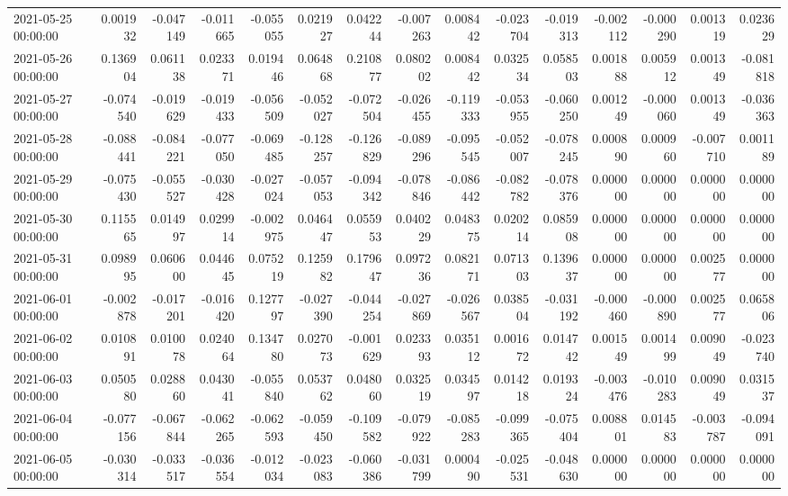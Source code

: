\begin{tabular}{lrrrrrrrrrrrrrr}
2021-05-25 00:00:00 & 0.001932 & -0.047149 & -0.011665 & -0.055055 & 0.021927 & 0.042244 & -0.007263 & 0.008442 & -0.023704 & -0.019313 & -0.002112 & -0.000290 & 0.001319 & 0.023629 \\
2021-05-26 00:00:00 & 0.136904 & 0.061138 & 0.023371 & 0.019446 & 0.064868 & 0.210877 & 0.080202 & 0.008442 & 0.032534 & 0.058503 & 0.001888 & 0.005912 & 0.001349 & -0.081818 \\
2021-05-27 00:00:00 & -0.074540 & -0.019629 & -0.019433 & -0.056509 & -0.052027 & -0.072504 & -0.026455 & -0.119333 & -0.053955 & -0.060250 & 0.001249 & -0.000060 & 0.001349 & -0.036363 \\
2021-05-28 00:00:00 & -0.088441 & -0.084221 & -0.077050 & -0.069485 & -0.128257 & -0.126829 & -0.089296 & -0.095545 & -0.052007 & -0.078245 & 0.000890 & 0.000960 & -0.007710 & 0.001189 \\
2021-05-29 00:00:00 & -0.075430 & -0.055527 & -0.030428 & -0.027024 & -0.057053 & -0.094342 & -0.078846 & -0.086442 & -0.082782 & -0.078376 & 0.000000 & 0.000000 & 0.000000 & 0.000000 \\
2021-05-30 00:00:00 & 0.115565 & 0.014997 & 0.029914 & -0.002975 & 0.046447 & 0.055953 & 0.040229 & 0.048375 & 0.020214 & 0.085908 & 0.000000 & 0.000000 & 0.000000 & 0.000000 \\
2021-05-31 00:00:00 & 0.098995 & 0.060600 & 0.044645 & 0.075219 & 0.125982 & 0.179647 & 0.097236 & 0.082171 & 0.071303 & 0.139637 & 0.000000 & 0.000000 & 0.002577 & 0.000000 \\
2021-06-01 00:00:00 & -0.002878 & -0.017201 & -0.016420 & 0.127797 & -0.027390 & -0.044254 & -0.027869 & -0.026567 & 0.038504 & -0.031192 & -0.000460 & -0.000890 & 0.002577 & 0.065806 \\
2021-06-02 00:00:00 & 0.010891 & 0.010078 & 0.024064 & 0.134780 & 0.027073 & -0.001629 & 0.023393 & 0.035112 & 0.001672 & 0.014742 & 0.001549 & 0.001499 & 0.009049 & -0.023740 \\
2021-06-03 00:00:00 & 0.050580 & 0.028860 & 0.043041 & -0.055840 & 0.053762 & 0.048060 & 0.032519 & 0.034597 & 0.014218 & 0.019324 & -0.003476 & -0.010283 & 0.009049 & 0.031537 \\
2021-06-04 00:00:00 & -0.077156 & -0.067844 & -0.062265 & -0.062593 & -0.059450 & -0.109582 & -0.079922 & -0.085283 & -0.099365 & -0.075404 & 0.008801 & 0.014583 & -0.003787 & -0.094091 \\
2021-06-05 00:00:00 & -0.030314 & -0.033517 & -0.036554 & -0.012034 & -0.023083 & -0.060386 & -0.031799 & 0.000490 & -0.025531 & -0.048630 & 0.000000 & 0.000000 & 0.000000 & 0.000000 \\

\end{tabular}
